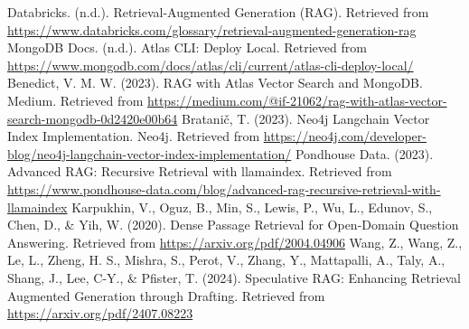 \documentclass{wseas}
\begin{document}
\begin{thebibliography}{9}
  Databricks. (n.d.). Retrieval-Augmented Generation (RAG). Retrieved
  from
  \url{https://www.databricks.com/glossary/retrieval-augmented-generation-rag}
  MongoDB Docs. (n.d.). Atlas CLI: Deploy Local. Retrieved from
  \url{https://www.mongodb.com/docs/atlas/cli/current/atlas-cli-deploy-local/}
  Benedict, V. M. W. (2023). RAG with Atlas Vector Search and MongoDB.
  Medium. Retrieved from
  \href{https://medium.com/@if-21062/rag-with-atlas-vector-search-mongodb-0d2420e00b64}{https://medium.com/@if-21062/rag-with-atlas-vector-search-mongodb-0d2420e00b64}
  Bratanič, T. (2023). Neo4j Langchain Vector Index Implementation.
  Neo4j. Retrieved from
  \url{https://neo4j.com/developer-blog/neo4j-langchain-vector-index-implementation/}
  Pondhouse Data. (2023). Advanced RAG: Recursive Retrieval with
  llamaindex. Retrieved from
  \url{https://www.pondhouse-data.com/blog/advanced-rag-recursive-retrieval-with-llamaindex}
  Karpukhin, V., Oguz, B., Min, S., Lewis, P., Wu, L., Edunov, S., Chen,
  D., \& Yih, W. (2020). Dense Passage Retrieval for Open-Domain
  Question Answering. Retrieved from
  \url{https://arxiv.org/pdf/2004.04906}
  Wang, Z., Wang, Z., Le, L., Zheng, H. S., Mishra, S., Perot, V.,
  Zhang, Y., Mattapalli, A., Taly, A., Shang, J., Lee, C-Y., \& Pfister,
  T. (2024). Speculative RAG: Enhancing Retrieval Augmented Generation
  through Drafting. Retrieved from
  \url{https://arxiv.org/pdf/2407.08223}

\end{thebibliography}

    
\end{document}
